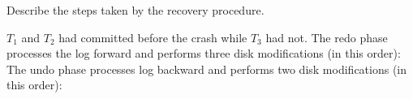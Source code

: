 \noindent Describe the steps taken by the recovery procedure.

\begin{sol}
 $T_1$ and $T_2$ had committed before the crash while $T_3$ had not. The redo phase processes the log forward and performs three disk modifications (in this order):
The undo phase processes log backward and performs two disk modifications (in this order):
\end{sol}




